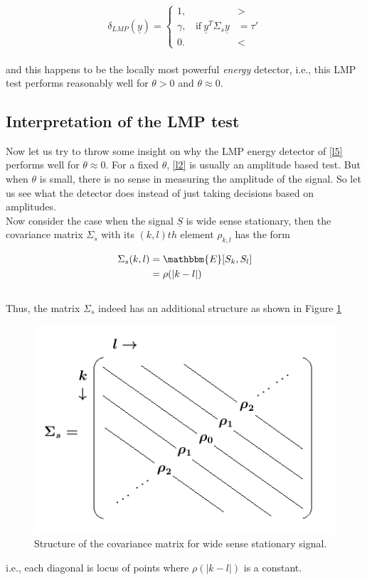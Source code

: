 \documentclass[12pt]{report}
\begin{document}
\begin{equation}
\label{l5}
{\delta}_{LMP} (\underline{y}) =  
\begin{cases}
1, &>  \\
\gamma,  \ \ \ \  \mbox{if}~{\underline{y}}^T\Sigma_s{\underline{y}}&= \tau'  \\
0. &<
\end{cases}
\end{equation}\\
and this happens to be the locally most powerful \textit{energy} detector, i.e., this LMP test performs reasonably well for $\theta>0$ and $\theta \approx 0$.
	
\subsection{Interpretation of the LMP test}

Now let us try to throw some insight on why the LMP energy detector of \eqref{l5} performs well for $\theta \approx 0$. For a fixed $\theta$, \eqref{l2} is usually an amplitude based test. But when $\theta$ is small, there is no sense in measuring the amplitude of the signal. So let us see what the detector does instead of just taking decisions based on amplitudes.\\

Now consider the case when the signal ${\underline{S}}$ is wide sense stationary, then the covariance matrix $\Sigma_s$ with its $(k,l)th$ element $\rho_{k,l}$ has the form
	
\begin{equation}
\begin{aligned}
\Sigma_s(k,l) &= \mathbbm{E}[S_k,S_l]\\
&= \rho(|k-l|) 
\end{aligned}
\end{equation}\\
Thus, the matrix $\Sigma_s$ indeed has an additional structure as shown in Figure \ref{fig:CovarianceMat}

\begin{figure}[h]
\centering
\includegraphics[scale=0.6]{Figures/CovMatWSS.png}
\caption{Structure of the covariance matrix for wide sense stationary signal.}	
\label{fig:CovarianceMat}	
\end{figure}
\noindent i.e., each diagonal is locus of points where $\rho(|k-l|)$ is a constant.\\
\end{document}
